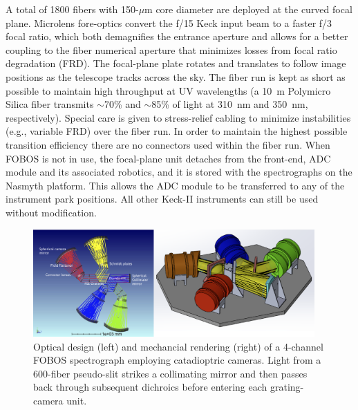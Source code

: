 A total of 1800 fibers with 150-$\mu$m core diameter are deployed at
the curved focal plane. Microlens fore-optics convert the f/15 Keck
input beam to a faster f/3 focal ratio, which both demagnifies the
entrance aperture and allows for a better coupling to the fiber
numerical aperture that minimizes losses from focal ratio degradation
(FRD). The focal-plane plate rotates and translates to follow image
positions as the telescope tracks across the sky. The fiber run is
kept as short as possible to maintain high throughput at UV
wavelengths (a 10~m Polymicro Silica fiber transmits $\sim$70\% and
$\sim$85\% of light at 310~nm and 350~nm, respectively). Special care
is given to stress-relief cabling to minimize instabilities (e.g.,
variable FRD) over the fiber run. In order to maintain the highest
possible transition efficiency there are no connectors used within
the fiber run. When FOBOS is not in use, the focal-plane unit
detaches from the front-end, ADC module and its associated robotics,
and it is stored with the spectrographs on the Nasmyth platform. This
allows the ADC module to be transferred to any of the instrument park
positions. All other Keck-II instruments can still be used without
modification.

\begin{figure}[h!]
\vskip -0.1in
\includegraphics[width=0.96\textwidth]{figs/FOBOS_spec_optical-CAD.png}
\caption{\small Optical design (left) and mechancial rendering (right) of a 4-channel FOBOS spectrograph employing catadioptric cameras.
Light from a 600-fiber pseudo-slit strikes a collimating mirror and then
passes back through subsequent dichroics before entering each grating-camera unit.}
\label{fig:spectrograph}
\end{figure}

